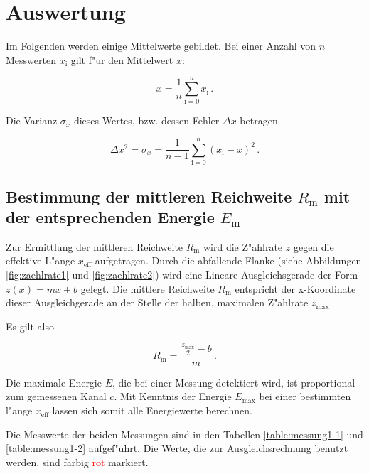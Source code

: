 \section{Auswertung}
\label{sec:auswertung}
	Im Folgenden werden einige Mittelwerte gebildet.
	Bei einer Anzahl von $n$ Messwerten $x_\mathrm{i}$ gilt f"ur den Mittelwert $x$:

	\begin{equation*}
		x = \frac{1}{n} \sum_{\mathrm{i} = 0}^n {x_\mathrm{i}} \,.
	\end{equation*}

	Die Varianz $\sigma_x$ dieses Wertes, bzw. dessen Fehler $\Delta x$ betragen

	\begin{equation*}
		\Delta x^2 = \sigma_x = \frac{1}{n - 1} \sum_{\mathrm{i} = 0}^n{\left(x_\mathrm{i} - x\right)^2} \,.
	\end{equation*}

	\subsection{Bestimmung der mittleren Reichweite $R_\mathrm{m}$ mit der entsprechenden Energie $E_\mathrm{m}$}
	\label{subsec:mittlere_reichweite}
		Zur Ermittlung der mittleren Reichweite $R_\mathrm{m}$ wird die Z"ahlrate $z$ gegen die effektive L"ange $x_\mathrm{eff}$ aufgetragen.
		Durch die abfallende Flanke (siehe Abbildungen \ref{fig:zaehlrate1} und \ref{fig:zaehlrate2}) wird eine Lineare Ausgleichsgerade der Form $z(x) = mx + b$ gelegt.
		Die mittlere Reichweite $R_\mathrm{m}$ entspricht der x-Koordinate dieser Ausgleichgerade an der Stelle der halben, maximalen Z"ahlrate $z_\mathrm{max}$.

		Es gilt also

		\begin{equation*}
			R_\mathrm{m} = \frac{\frac{z_\mathrm{max}}{2} - b}{m} \,.
		\end{equation*}

		Die maximale Energie $E$, die bei einer Messung detektiert wird, ist proportional zum gemessenen Kanal $c$.
		Mit Kenntnis der Energie $E_\mathrm{max}$ bei einer bestimmten l"ange $x_\mathrm{eff}$ lassen sich somit alle Energiewerte berechnen.

		Die Messwerte der beiden Messungen sind in den Tabellen \ref{table:messung1-1} und \ref{table:messung1-2} aufgef"uhrt.
		Die Werte, die zur Ausgleichsrechnung benutzt werden, sind farbig \textcolor{red}{rot} markiert.

